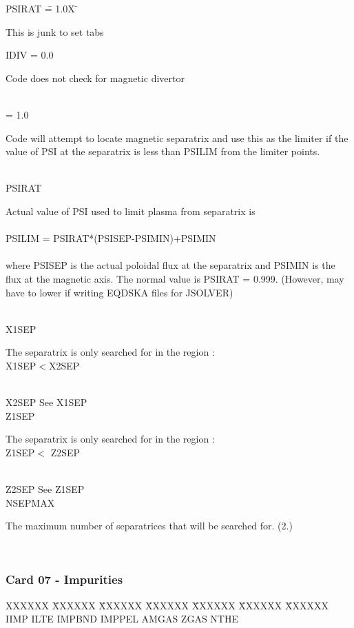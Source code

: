 \begin{tabbing} 
PSIRAT \= = 1.0X \= \parbox[t]{\width}{This is junk to set tabs} \kill 
IDIV \> = 0.0 \> \parbox[t]{\width}{Code does not check for magnetic divertor}\\ 
     \> = 1.0 \> \parbox[t]{\width}{Code will attempt to locate magnetic separatrix and use this
as the limiter if the value of PSI at the separatrix is less than PSILIM from the limiter points.}\\ 
PSIRAT \> \>\parbox[t]{\width}{Actual value of PSI used to limit plasma from separatrix is\\ 
 \\ 
PSILIM = PSIRAT*(PSISEP-PSIMIN)+PSIMIN\\ 
 \\ 
where PSISEP is the actual poloidal flux at the separatrix and PSIMIN is the flux at the magnetic
axis.  The normal value is PSIRAT = 0.999. (However, may have to lower if writing EQDSKA
files for JSOLVER)}\\ 
X1SEP \> \> \parbox[t]{\width}{The separatrix is only searched for in the region :\\
X1SEP$<$X2SEP}\\ 
X2SEP \> \> See X1SEP\\ 
Z1SEP \> \> \parbox[t]{\width}{The separatrix is only searched for in the region :\\
Z1SEP$<$ Z2SEP}\\ 
Z2SEP \> \> See Z1SEP\\ 
NSEPMAX \> \> \parbox[t]{\width}{The maximum number of separatrices that will be searched
for. (2.)}\\ 
\end{tabbing}
\newpage \subsubsection{Card 07 - Impurities} 
\begin{tabbing} 
XXXXXX \= XXXXXX \= XXXXXX \= XXXXXX \= XXXXXX \= XXXXXX \=
XXXXXX        \\ 
\footnotesize IIMP \>\footnotesize ILTE \>\footnotesize IMPBND \>\footnotesize IMPPEL
\>\footnotesize AMGAS \>\footnotesize ZGAS \>\footnotesize NTHE 
\end{tabbing}

